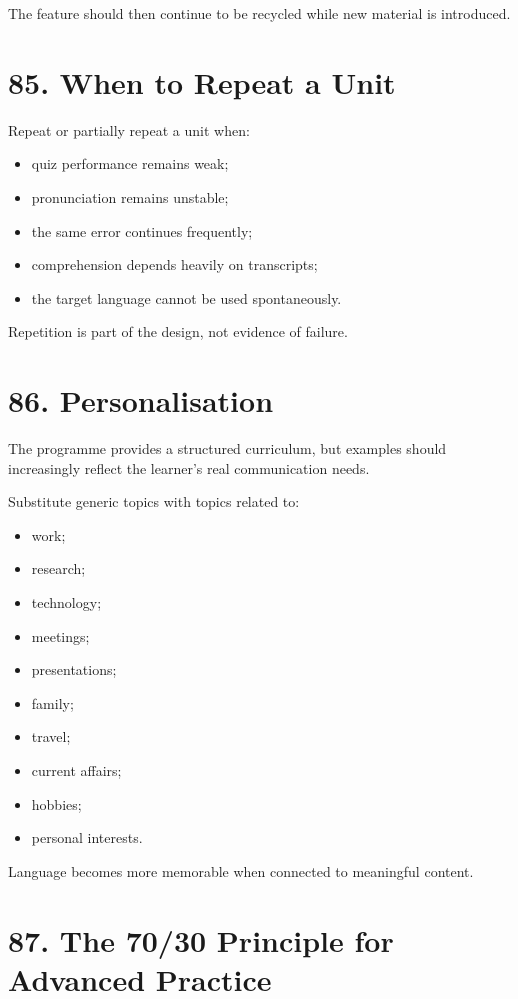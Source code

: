 The feature should then continue to be recycled while new material is introduced.

\section*{85. When to Repeat a Unit}

Repeat or partially repeat a unit when:

\begin{itemize}
    \item quiz performance remains weak;
    \item pronunciation remains unstable;
    \item the same error continues frequently;
    \item comprehension depends heavily on transcripts;
    \item the target language cannot be used spontaneously.
\end{itemize}

Repetition is part of the design, not evidence of failure.

\section*{86. Personalisation}

The programme provides a structured curriculum, but examples should increasingly reflect the learner's real communication needs.

Substitute generic topics with topics related to:

\begin{itemize}
    \item work;
    \item research;
    \item technology;
    \item meetings;
    \item presentations;
    \item family;
    \item travel;
    \item current affairs;
    \item hobbies;
    \item personal interests.
\end{itemize}

Language becomes more memorable when connected to meaningful content.

\section*{87. The 70/30 Principle for Advanced Practice}

